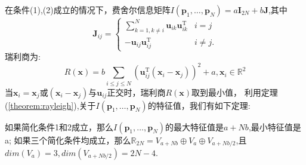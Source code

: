 在条件(1),(2)成立的情况下，费舍尔信息矩阵$I(\bm{p}_1,\dots,\bm{p}_N)=a\bm{I}_{2N}+b\bm{J}$,其中
\begin{equation}
\bm{J}_{ij}=\begin{cases}
\sum_{k=1,k\neq i}^N \bm{u}_{ik}\bm{u}_{ik}^{\textrm{T}} &i=j\\
-\bm{u}_{ij}\bm{u}_{ij}^{\textrm{T}} &i\neq j.
\end{cases}
\end{equation}
瑞利商为:
\begin{equation}
R(\bm{x})=b\sum_{i\leq j\leq N} (\bm{u}_{ij}^{\textrm{T}} (\bm{x}_i-\bm{x}_j))^2+a,\bm{x}_i\in \mathbb{R}^2
\end{equation}
当$\bm{x}_i=\bm{x}_j$或$(\bm{x}_i-\bm{x}_j)$与$\bm{u}_{ij}$正交时，瑞利商$R(\bm{x})$取到最小值，
利用定理(\ref{theorem:rayleigh}),关于$I(\bm{p}_1,\dots,\bm{p}_N)$的特征值，我们有如下定理:
\begin{theorem}
如果简化条件1和2成立，那么$I(\bm{p}_1,\dots,\bm{p}_N)$的最大特征值是$a+Nb$,最小特征值是a;
如果三个简化条件均成立，那么$\mathbb{R}_{2N}=V_{a+Nb}\oplus V_a\oplus V_{a+Nb/2}$,且$dim(V_a)=3,dim(V_{a+Nb/2})=2N-4$.
\end{theorem}
